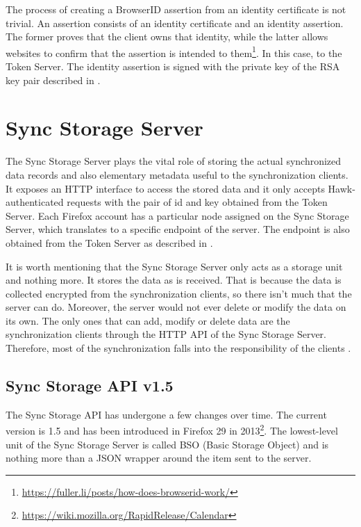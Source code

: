 The process of creating a BrowserID assertion from an identity certificate is not trivial. An assertion consists of an identity certificate and an identity assertion. The former proves that the client owns that identity, while the latter allows websites to confirm that the assertion is intended to them\footnote{\url{https://fuller.li/posts/how-does-browserid-work/}}. In this case, to the Token Server. The identity assertion is signed with the private key of the RSA key pair described in .

\section{Sync Storage Server}
\label{sec:sync-storage-server}

The Sync Storage Server plays the vital role of storing the actual synchronized data records and also elementary metadata useful to the synchronization clients. It exposes an HTTP interface to access the stored data and it only accepts Hawk-authenticated requests with the pair of id and key obtained from the Token Server. Each Firefox account has a particular node assigned on the Sync Storage Server, which translates to a specific endpoint of the server. The endpoint is also obtained from the Token Server as described in .

It is worth mentioning that the Sync Storage Server only acts as a storage unit and nothing more. It stores the data as is received. That is because the data is collected encrypted from the synchronization clients, so there isn't much that the server can do. Moreover, the server would not ever delete or modify the data on its own. The only ones that can add, modify or delete data are the synchronization clients through the HTTP API of the Sync Storage Server. Therefore, most of the synchronization falls into the responsibility of the clients \cite{sync-client-docs}.

\subsection{Sync Storage API v1.5}
\label{sub-sec:sync-storage-api}

The Sync Storage API has undergone a few changes over time. The current version is 1.5 and has been introduced in Firefox 29 in 2013\footnote{\url{https://wiki.mozilla.org/RapidRelease/Calendar}}. The lowest-level unit of the Sync Storage Server is called BSO (Basic Storage Object) and is nothing more than a JSON wrapper around the item sent to the server.

